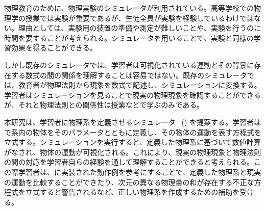 物理教育のために、物理実験のシミュレータが利用されている。高等学校での物理学の授業では実験が重要であるが、生徒全員が実験を経験しているわけではない。理由としては、実験用の装置の準備や測定が難しいことや、実験を行うのに時間を要することが考えられる。シミュレータを用いることで、実験と同様の学習効果を得ることができる。


しかし既存のシミュレータでは、学習者は可視化されている運動とその背景に存在する数式の間の関係を理解することは容易ではない。既存のシミュレータでは、教育者が物理法則から現象を数式で記述し、シミュレーションに変換する。学習者はシミュレーションを見ることで現実の物理現象を確認することができるが、それと物理法則との関係性は授業などで学ぶのみである。

本研究は、学習者に物理系を定義させるシミュレータ \simnamealt~(\simname) を提案する。学習者は \simname で系内の物体をそのパラメータとともに定義し、その物体の運動を表す方程式を立式する。シミュレーションを実行すると、定義した物理系に基づいて数値計算がなされ、物体の運動が可視化される。これにより、現実の物理現象と物理法則の間の対応を学習者自らの経験を通して理解することができると考えられる。この際学習者は、\simname に実装された動作例を参考にすることで、定義した物理系と現実の運動を比較することができたり、次元の異なる物理量の和が存在する不正な方程式を立式すると警告されるなど、正しい物理系を作成するための補助を受ける。

